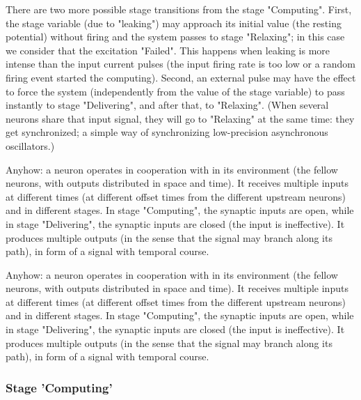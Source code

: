 There are two more possible stage transitions from the stage "Computing".
First, the stage variable (due to "leaking") may approach its initial value (the resting potential) without firing and the system passes to stage "Relaxing"; in this case we consider that the excitation "Failed".
This happens when leaking is more intense than the input current pulses (the input firing rate is too low or a random firing event started the computing).
Second, an external pulse may have the effect to force the system (independently from the value of the stage variable) to pass instantly to stage "Delivering", and after that, to "Relaxing". (When several neurons share that input signal,
they will go to "Relaxing" at the same time: they get synchronized; a simple way of synchronizing low-precision asynchronous oscillators.)


\fi

\ifx\magyar\undefined

Anyhow: a neuron operates in cooperation with in its environment (the fellow neurons, with outputs distributed in space and time).
It receives multiple inputs at different times (at different offset times from the different upstream neurons) and in different stages. 
In stage "Computing", the synaptic inputs are open, while
in stage "Delivering", the synaptic inputs are closed (the input is ineffective).
It produces multiple outputs (in the sense that the signal may branch along its path), in form of a signal with temporal course.
\else

Anyhow: a neuron operates in cooperation with in its environment (the fellow neurons, with outputs distributed in space and time).
It receives multiple inputs at different times (at different offset times from the different upstream neurons) and in different stages. 
In stage "Computing", the synaptic inputs are open, while
in stage "Delivering", the synaptic inputs are closed (the input is ineffective).
It produces multiple outputs (in the sense that the signal may branch along its path), in form of a signal with temporal course.
\fi


\ifx\magyar\undefined
 



\subsubsection[Computing]{Stage 'Computing'\label{sec:Single-OperationComputing}}

